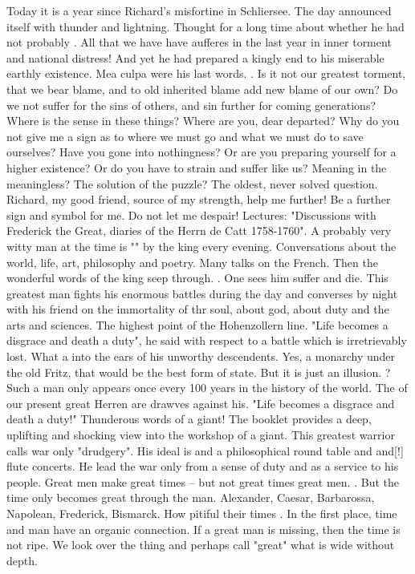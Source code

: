 
Today it is a year since Richard's misfortine in Schliersee. The day announced itself with thunder and lightning. Thought for a long time about whether he had not probably . All that we have have aufferes in the last year in inner torment and national distress! And yet he had prepared a kingly end to his miserable earthly existence. Mea culpa were his last words. . Is it not our greatest torment, that we bear blame, and to old inherited blame add new blame of our own? Do we not suffer for the sins of others, and sin further for coming generations? Where is the sense in these things? Where are you, dear departed? Why do you not give me a sign as to where we must go and what we must do to save ourselves? Have you gone into nothingness? Or are you preparing yourself for a higher existence? Or do you have to strain and suffer like us? Meaning in the meaningless? The solution of the puzzle? The oldest, never solved question. Richard, my good friend, source of my strength, help me further! Be a further sign and symbol for me. Do not let me despair! Lectures: "Discussions with Frederick the Great, diaries of the Herrn de Catt 1758-1760". A probably very witty man at the time is "" by the king every evening. Conversations about the world, life, art, philosophy and poetry. Many  talks on the French. Then the wonderful words of the king seep through. . One sees him suffer and die. This greatest man fights his enormous battles during the day and converses by night with his friend on the immortality of thr soul, about god, about duty and the arts and sciences. The highest point of the Hohenzollern line. "Life becomes a disgrace and death a duty", he said with respect to a battle which is irretrievably lost. What a  into the ears of his unworthy descendents. Yes, a monarchy under the old Fritz, that would be the best form of state. But it is just an illusion. ? Such a man only appears once every 100 years in the history of the world. The  of our present great Herren are drawves against his. "Life becomes a disgrace and death a duty!" Thunderous words of a giant! The booklet provides a deep, uplifting and shocking view into the workshop of a giant. This greatest warrior calls war only "drudgery". His ideal is  and a philosophical round table and and[!] flute concerts. He lead the war only from a sense of duty and as a service to his people. Great men make great times -- but not great times great men. . But the time only becomes great through the man. Alexander, Caesar, Barbarossa, Napolean, Frederick, Bismarck. How pitiful their times . In the first place, time and man have an organic connection. If a great man is missing, then the time is not ripe. We look over the thing and perhaps call "great" what is wide without depth. 